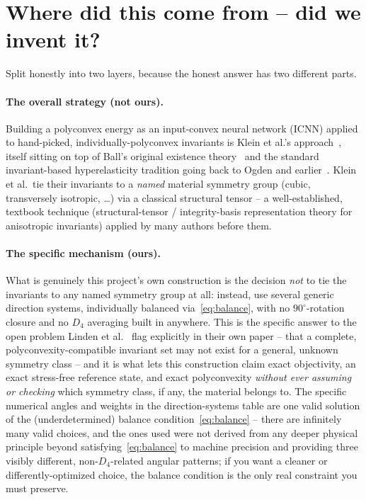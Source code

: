 \documentclass[11pt,a4paper]{article}
\begin{document}
\section{Where did this come from -- did we invent it?}
\label{sec:provenance}

Split honestly into two layers, because the honest answer has two
different parts.

\paragraph{The overall strategy (not ours).} Building a polyconvex
energy as an input-convex neural network (ICNN) applied to hand-picked,
individually-polyconvex invariants is Klein et al.'s
approach~\cite{Klein2022}, itself sitting on top of Ball's original
existence theory~\cite{Ball1977} and the standard invariant-based
hyperelasticity tradition going back to Ogden and
earlier~\cite{Ogden1984}. Klein et al.\ tie their invariants to a
\emph{named} material symmetry group (cubic, transversely isotropic,
\dots) via a classical structural tensor -- a well-established, textbook
technique (structural-tensor / integrity-basis representation theory
for anisotropic invariants) applied by many authors before them.

\paragraph{The specific mechanism (ours).} What is genuinely this
project's own construction is the decision \emph{not} to tie the
invariants to any named symmetry group at all: instead, use several
generic direction systems, individually balanced
via~\eqref{eq:balance}, with no $90^\circ$-rotation closure and no
$D_4$ averaging built in anywhere. This is the specific answer to the
open problem Linden et al.~\cite{Linden2023} flag explicitly in their
own paper -- that a complete, polyconvexity-compatible invariant set
may not exist for a general, unknown symmetry class -- and it is what
lets this construction claim exact objectivity, an exact stress-free
reference state, and exact polyconvexity \emph{without ever assuming or
checking} which symmetry class, if any, the material belongs to. The
specific numerical angles and weights in the direction-systems table
are one valid solution of the (underdetermined) balance
condition~\eqref{eq:balance} -- there are infinitely many valid
choices, and the ones used were not derived from any deeper physical
principle beyond satisfying~\eqref{eq:balance} to machine precision and
providing three visibly different, non-$D_4$-related angular
patterns; if you want a cleaner or differently-optimized choice, the
balance condition is the only real constraint you must preserve.
\end{document}
